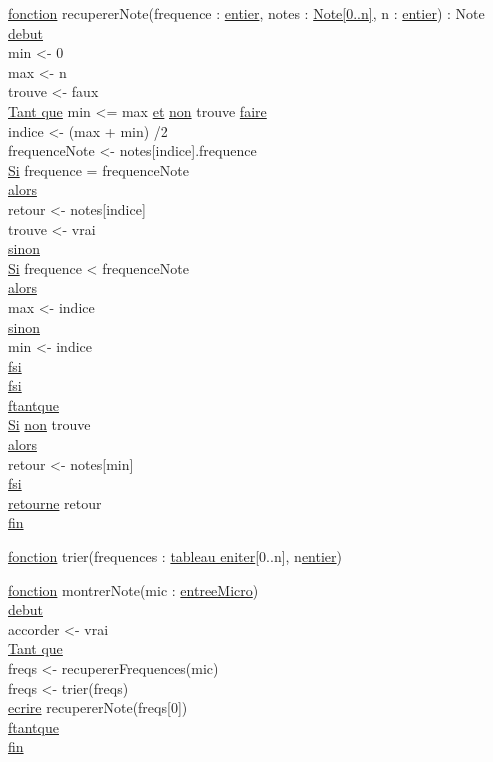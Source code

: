 \begin{tabbing}
\ul{fonction} recupererNote(frequence : \ul{entier}, notes : \ul{Note[0..n]}, n : \ul{entier}) : Note\\
\ul{debut}\\
min <- 0\\
max <- n\\
trouve <- faux\\
\ul{Tant que} min <= max \ul{et} \ul{non} trouve \ul{faire}\\
    indice <- (max + min) /2 \\
    frequenceNote <- notes[indice].frequence\\
    \ul{Si} frequence = frequenceNote\\
    \ul{alors}\\
        retour <- notes[indice]\\
        trouve <- vrai\\
    \ul{sinon}\\
        \ul{Si} frequence < frequenceNote\\
        \ul{alors}\\
            max <- indice\\
        \ul{sinon}\\
            min <- indice\\
        \ul{fsi}\\
    \ul{fsi}\\
\ul{ftantque}\\
\ul{Si} \ul{non} trouve\\
\ul{alors}\\
    retour <- notes[min]\\
\ul{fsi}\\
\ul{retourne} retour\\
\ul{fin}\\
\end{tabbing}


\begin{tabbing}
\ul{fonction} trier(frequences : \ul{tableau eniter}[0..n], n\ul{entier})
\end{tabbing}


\begin{tabbing}
\ul{fonction} montrerNote(mic : \ul{entreeMicro})\\
\ul{debut}\\
accorder <- vrai\\
\ul{Tant que}\\
freqs <- recupererFrequences(mic)\\
freqs <- trier(freqs)\\
\ul{ecrire} recupererNote(freqs[0])\\
\ul{ftantque}\\
\ul{fin}\\
\end{tabbing}

